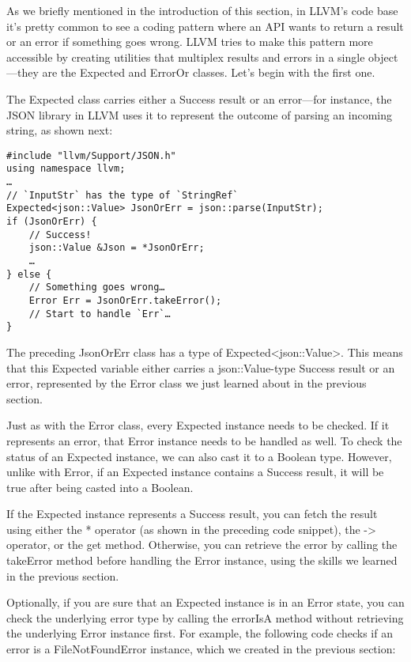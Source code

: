 
As we briefly mentioned in the introduction of this section, in LLVM's code base it's pretty common to see a coding pattern where an API wants to return a result or an error if something goes wrong. LLVM tries to make this pattern more accessible by creating utilities that multiplex results and errors in a single object—they are the Expected and ErrorOr classes. Let's begin with the first one.



The Expected class carries either a Success result or an error—for instance, the JSON library in LLVM uses it to represent the outcome of parsing an incoming string, as shown next:

\begin{lstlisting}[style=styleCXX]
#include "llvm/Support/JSON.h"
using namespace llvm;
…
// `InputStr` has the type of `StringRef`
Expected<json::Value> JsonOrErr = json::parse(InputStr);
if (JsonOrErr) {
	// Success!
	json::Value &Json = *JsonOrErr;
	…
} else {
	// Something goes wrong…
	Error Err = JsonOrErr.takeError();
	// Start to handle `Err`…
}
\end{lstlisting}

The preceding JsonOrErr class has a type of Expected<json::Value>. This means that this Expected variable either carries a json::Value-type Success result or an error, represented by the Error class we just learned about in the previous section.

Just as with the Error class, every Expected instance needs to be checked. If it represents an error, that Error instance needs to be handled as well. To check the status of an Expected instance, we can also cast it to a Boolean type. However, unlike with Error, if an Expected instance contains a Success result, it will be true after being casted into a Boolean.

If the Expected instance represents a Success result, you can fetch the result using either the * operator (as shown in the preceding code snippet), the -> operator, or the get method. Otherwise, you can retrieve the error by calling the takeError method before handling the Error instance, using the skills we learned in the previous section.

Optionally, if you are sure that an Expected instance is in an Error state, you can check the underlying error type by calling the errorIsA method without retrieving the underlying Error instance first. For example, the following code checks if an error is a FileNotFoundError instance, which we created in the previous section:

